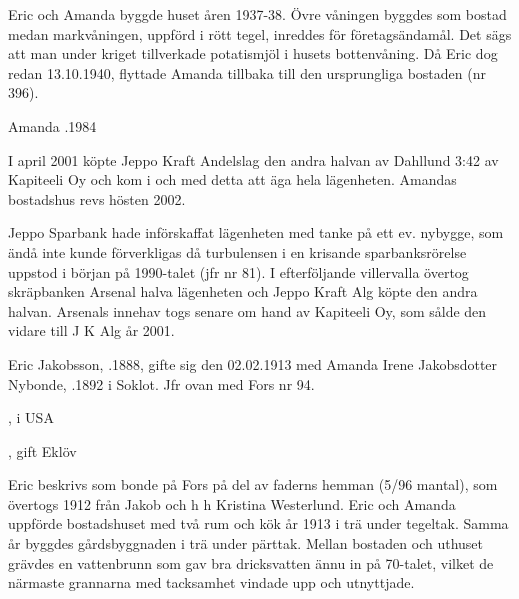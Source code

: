 Eric och Amanda byggde huset åren 1937-38. Övre våningen byggdes som bostad medan markvåningen, uppförd i rött tegel, inreddes för 	företagsändamål. Det sägs att man under kriget tillverkade potatismjöl i husets  bottenvåning. Då Eric dog redan 13.10.1940, flyttade Amanda tillbaka till den ursprungliga bostaden (nr 396).


Amanda .1984




I april 2001 köpte Jeppo Kraft Andelslag den andra halvan av Dahllund 3:42 av Kapiteeli Oy och kom i och med detta att äga hela lägenheten. Amandas bostadshus revs hösten 2002.

Jeppo Sparbank hade införskaffat lägenheten med tanke på ett ev. nybygge, som ändå inte kunde förverkligas då turbulensen i en krisande sparbanksrörelse uppstod i början på 1990-talet (jfr nr 81). I efterföljande villervalla övertog skräpbanken Arsenal halva lägenheten och Jeppo Kraft Alg köpte den andra halvan. Arsenals innehav togs senare om hand av Kapiteeli Oy, som sålde den vidare till J K Alg år 2001.





Eric Jakobsson, .1888, gifte sig den 02.02.1913 med Amanda Irene Jakobsdotter Nybonde, .1892 i Soklot. Jfr ovan med Fors nr 94.
\begin{jhchildren}
  \item {}, i USA
  \item {}
  \item {}, gift Eklöv
\end{jhchildren}

Eric beskrivs som bonde på Fors på del av faderns hemman (5/96 mantal), som övertogs 1912 från Jakob och h h Kristina Westerlund. Eric och Amanda uppförde bostadshuset med två rum och kök år 1913 i trä under tegeltak. Samma år byggdes gårdsbyggnaden i trä under pärttak. Mellan bostaden och uthuset grävdes en vattenbrunn som gav bra dricksvatten ännu in på 70-talet, vilket de närmaste grannarna med tacksamhet vindade upp och utnyttjade.

